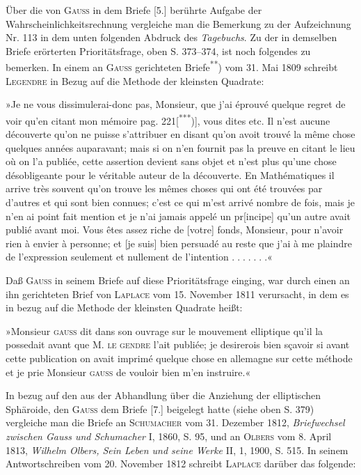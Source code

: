 {\indent Über die von \textsc{Gauss} in dem Briefe [5.] berührte Aufgabe der Wahrscheinlichkeitsrechnung vergleiche man die Bemerkung zu der Aufzeichnung Nr. 113 in dem unten folgenden Abdruck des \textit{Tagebuchs}. Zu der in demselben Briefe erörterten Prioritätsfrage, oben S. 373–374, ist noch folgendes zu bemerken. In einem an \textsc{Gauss} gerichteten Briefe\textsuperscript{**}) vom 31. Mai 1809 schreibt \textsc{Legendre} in Bezug auf die Methode der kleinsten Quadrate:

\indent »Je ne vous dissimulerai-donc pas, Monsieur, que j’ai éprouvé quelque regret de voir qu’en citant mon mémoire pag. 221[\textsuperscript{***})], vous dites  etc. Il n’est aucune découverte qu’on ne puisse s’attribuer en disant qu’on avoit trouvé la même chose quelques années auparavant; mais si on n’en fournit pas la preuve en citant le lieu où on l’a publiée, cette assertion devient sans objet et n’est plus qu’une chose désobligeante pour le véritable auteur de la découverte. En Mathématiques il arrive très souvent qu’on trouve les mêmes choses qui ont été trouvées par d’autres et qui sont bien connues; c’est ce qui m’est arrivé nombre de fois, mais je n’en ai point fait mention et je n’ai jamais appelé  un pr[incipe] qu’un autre avait publié avant moi. Vous êtes assez riche de [votre] fonds, Monsieur, pour n’avoir rien à envier à personne; et [je suis] bien persuadé au reste que j’ai à me plaindre de l’expression seulement et nullement de l’intention \({.}\;{.}\;{.}\;{.}\;{.}\;{.}\;{.}\)«

\indent Daß \textsc{Gauss} in seinem Briefe auf diese Prioritätsfrage einging, war durch einen an ihn gerichteten Brief von \textsc{Laplace} vom 15. November 1811 verursacht, in dem es in bezug auf die Methode der kleinsten Quadrate heißt:

\indent »Monsieur \textsc{gauss} dit dans son ouvrage sur le mouvement elliptique qu’il la possedait avant que M. \textsc{le gendre} l’ait publiée; je desirerois bien sçavoir si avant cette publication on avait imprimé quelque chose en allemagne sur cette méthode et je prie Monsieur \textsc{gauss} de vouloir bien m’en instruire.«

\indent In bezug auf den  aus der Abhandlung über die Anziehung der elliptischen Sphäroide, den \textsc{Gauss} dem Briefe [7.] beigelegt hatte (siehe oben S. 379) vergleiche man die Briefe an \textsc{Schumacher} vom 31. Dezember 1812, \textit{Briefwechsel zwischen Gauss und Schumacher} I, 1860, S. 95, und an \textsc{Olbers} vom 8. April 1813, \textit{Wilhelm Olbers, Sein Leben und seine Werke} II, 1, 1900, S. 515. In seinem Antwortschreiben vom 20. November 1812 schreibt \textsc{Laplace} darüber das folgende:

}
